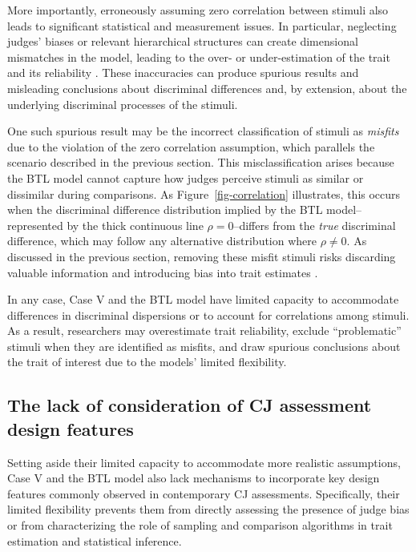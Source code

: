 \documentclass[
  authoryear,
  review,
  1p]{elsarticle}
\begin{document}
More importantly, erroneously assuming zero correlation between stimuli
also leads to significant statistical and measurement issues. In
particular, neglecting judges' biases or relevant hierarchical
structures can create dimensional mismatches in the model, leading to
the over- or under-estimation of the trait and its reliability
\citep{Reckase_et_al_1986, Ackerman_1989, Kahraman_2013, Hoyle_et_al_2023}.
These inaccuracies can produce spurious results and misleading
conclusions about discriminal differences \citep{McElreath_2020} and, by
extension, about the underlying discriminal processes of the stimuli.

One such spurious result may be the incorrect classification of stimuli
as \emph{misfits} due to the violation of the zero correlation
assumption, which parallels the scenario described in the previous
section. This misclassification arises because the BTL model cannot
capture how judges perceive stimuli as similar or dissimilar during
comparisons. As Figure~\ref{fig-correlation} illustrates, this occurs
when the discriminal difference distribution implied by the BTL
model--represented by the thick continuous line \(\rho = 0\)--differs
from the \emph{true} discriminal difference, which may follow any
alternative distribution where \(\rho \neq 0\). As discussed in the
previous section, removing these misfit stimuli risks discarding
valuable information and introducing bias into trait estimates
\citep{Miller_2023}.

In any case, Case V and the BTL model have limited capacity to
accommodate differences in discriminal dispersions or to account for
correlations among stimuli. As a result, researchers may overestimate
trait reliability, exclude ``problematic'' stimuli when they are
identified as misfits, and draw spurious conclusions about the trait of
interest due to the models' limited flexibility.

\subsection{The lack of consideration of CJ assessment design
features}\label{sec-theory-issue2}

Setting aside their limited capacity to accommodate more realistic
assumptions, Case V and the BTL model also lack mechanisms to
incorporate key design features commonly observed in contemporary CJ
assessments. Specifically, their limited flexibility prevents them from
directly assessing the presence of judge bias or from characterizing the
role of sampling and comparison algorithms in trait estimation and
statistical inference.
\end{document}
